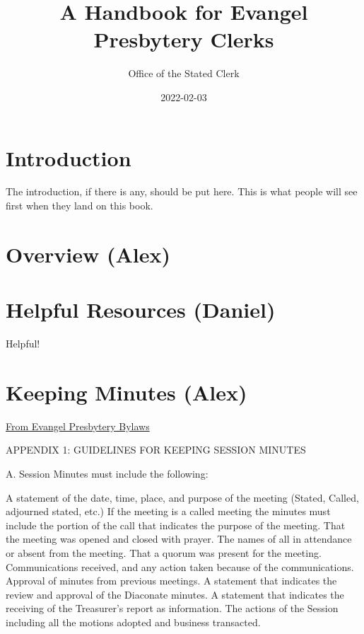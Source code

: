 \documentclass[
]{book}
\title{A Handbook for Evangel Presbytery Clerks}
\author{Office of the Stated Clerk}
\date{2022-02-03}
\begin{document}
\maketitle

{
\setcounter{tocdepth}{1}
\tableofcontents
}
\hypertarget{introduction}{%
\chapter{Introduction}\label{introduction}}

The introduction, if there is any, should be put here. This is what people will see first when they land on this book.

\hypertarget{overview-alex}{%
\chapter{Overview (Alex)}\label{overview-alex}}

\hypertarget{helpful-resources-daniel}{%
\chapter{Helpful Resources (Daniel)}\label{helpful-resources-daniel}}

Helpful!

\hypertarget{keeping-minutes-alex}{%
\chapter{Keeping Minutes (Alex)}\label{keeping-minutes-alex}}

\href{https://docs.google.com/document/d/1WZ4PrWPCNPNsUEmfXLPNXCNJz5qaB09T3HXnCkPh2ak/edit?usp=sharing}{From Evangel Presbytery Bylaws}

APPENDIX 1: GUIDELINES FOR KEEPING SESSION MINUTES

A. Session Minutes must include the following:

A statement of the date, time, place, and purpose of the meeting (Stated, Called, adjourned stated, etc.)
If the meeting is a called meeting the minutes must include the portion of the call that indicates the purpose of the meeting.
That the meeting was opened and closed with prayer.
The names of all in attendance or absent from the meeting.
That a quorum was present for the meeting.
Communications received, and any action taken because of the communications.
Approval of minutes from previous meetings.
A statement that indicates the review and approval of the Diaconate minutes.
A statement that indicates the receiving of the Treasurer's report as information.
The actions of the Session including all the motions adopted and business transacted.
\end{document}
